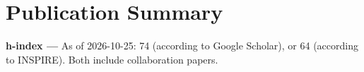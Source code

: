 \newcommand{\arxiv}[1]{[\href{http://arxiv.org/abs/#1}{arXiv:#1}]}
\def\zero{0}
\def\one{1}
\newcommand{\citeCount}[1]{%
  \def\val{#1}
  \ifx\val\zero%
  \else%
    \ifx\val\one%
    (1~citation)%
    \else%
    (#1~citations)%
    \fi%
  \fi}

\renewcommand{\citeCount}[1]{}


\setcounter{numPubs}{78}
\setcounter{pubCounter}{\value{numPubs}}


\newif\ifshowpubsummary
\showpubsummarytrue
\ifshowpubsummary
\section{Publication Summary}
{\bf h-index ---}%
As of 2026-10-25: 74 (according to Google Scholar), or 64 (according
to INSPIRE).  Both include collaboration papers.


